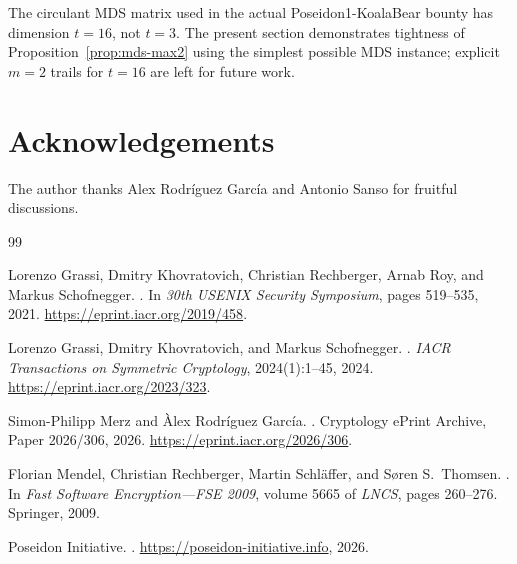 \documentclass[11pt]{article}
\begin{document}
\begin{remark}
    The circulant MDS matrix used in the actual Poseidon1-KoalaBear bounty has
    dimension $t=16$, not $t=3$.  The present section demonstrates tightness of
    Proposition~\ref{prop:mds-max2} using the simplest possible MDS instance;
    explicit $m=2$ trails for $t=16$ are left for future work.
\end{remark}

\section*{Acknowledgements}

The author thanks Alex Rodr\'{i}guez Garc\'{i}a and Antonio Sanso for fruitful discussions.

\begin{thebibliography}{99}

Lorenzo Grassi, Dmitry Khovratovich, Christian Rechberger, Arnab Roy, and Markus Schofnegger.
.
\newblock In \emph{30th USENIX Security Symposium}, pages 519--535, 2021.
\newblock \url{https://eprint.iacr.org/2019/458}.

Lorenzo Grassi, Dmitry Khovratovich, and Markus Schofnegger.
.
\newblock \emph{IACR Transactions on Symmetric Cryptology}, 2024(1):1--45, 2024.
\newblock \url{https://eprint.iacr.org/2023/323}.

Simon-Philipp Merz and {\`{A}}lex Rodr{\'{i}}guez Garc{\'{i}}a.
.
\newblock Cryptology ePrint Archive, Paper 2026/306, 2026.
\newblock \url{https://eprint.iacr.org/2026/306}.

Florian Mendel, Christian Rechberger, Martin Schl{\"a}ffer, and S{\o}ren S.~Thomsen.
.
\newblock In \emph{Fast Software Encryption---{FSE} 2009}, volume 5665 of
  \emph{LNCS}, pages 260--276. Springer, 2009.

{Poseidon Initiative}.
.
\newblock \url{https://poseidon-initiative.info}, 2026.

\end{thebibliography}
\end{document}
